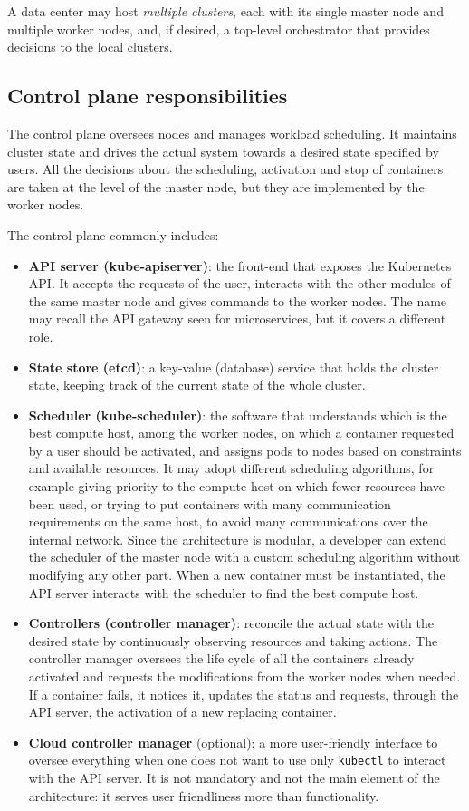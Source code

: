 A data center may host \emph{multiple clusters}, each with its single master node and multiple worker nodes, and, if desired, a top-level orchestrator that provides decisions to the local clusters.

\subsection{Control plane responsibilities}

The control plane oversees nodes and manages workload scheduling. It maintains cluster state and drives the actual system towards a desired state specified by users. All the decisions about the scheduling, activation and stop of containers are taken at the level of the master node, but they are implemented by the worker nodes.

The control plane commonly includes:

\begin{itemize}
\item \textbf{API server (kube-apiserver)}: the front-end that exposes the Kubernetes API. It accepts the requests of the user, interacts with the other modules of the same master node and gives commands to the worker nodes. The name may recall the API gateway seen for microservices, but it covers a different role.
\item \textbf{State store (etcd)}: a key-value (database) service that holds the cluster state, keeping track of the current state of the whole cluster.
\item \textbf{Scheduler (kube-scheduler)}: the software that understands which is the best compute host, among the worker nodes, on which a container requested by a user should be activated, and assigns pods to nodes based on constraints and available resources. It may adopt different scheduling algorithms, for example giving priority to the compute host on which fewer resources have been used, or trying to put containers with many communication requirements on the same host, to avoid many communications over the internal network. Since the architecture is modular, a developer can extend the scheduler of the master node with a custom scheduling algorithm without modifying any other part. When a new container must be instantiated, the API server interacts with the scheduler to find the best compute host.
\item \textbf{Controllers (controller manager)}: reconcile the actual state with the desired state by continuously observing resources and taking actions. The controller manager oversees the life cycle of all the containers already activated and requests the modifications from the worker nodes when needed. If a container fails, it notices it, updates the status and requests, through the API server, the activation of a new replacing container.
\item \textbf{Cloud controller manager} (optional): a more user-friendly interface to oversee everything when one does not want to use only \texttt{kubectl} to interact with the API server. It is not mandatory and not the main element of the architecture: it serves user friendliness more than functionality.
\end{itemize}

